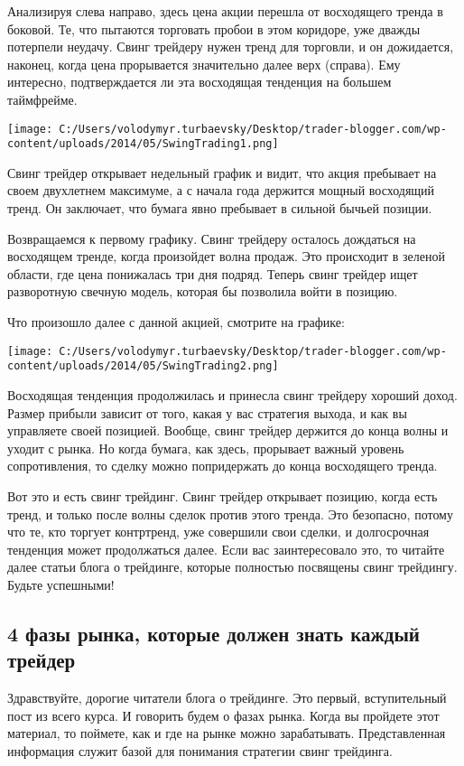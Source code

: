 \documentclass[a5paper]{article}
\begin{document}
Анализируя слева направо, здесь цена акции перешла от восходящего тренда в боковой. Те, что пытаются торговать пробои в этом коридоре, уже дважды потерпели неудачу. Свинг трейдеру нужен тренд для торговли, и он дожидается, наконец, когда цена прорывается значительно далее верх (справа). Ему интересно, подтверждается ли эта восходящая тенденция на большем таймфрейме.

\texttt{[image: C:/Users/volodymyr.turbaevsky/Desktop/trader-blogger.com/wp-content/uploads/2014/05/SwingTrading1.png]}

Свинг трейдер открывает недельный график и видит, что акция пребывает на своем двухлетнем максимуме, а с начала года держится мощный восходящий тренд. Он заключает, что бумага явно пребывает в сильной бычьей позиции.

Возвращаемся к первому графику. Свинг трейдеру осталось дождаться на восходящем тренде, когда произойдет волна продаж. Это происходит в зеленой области, где цена понижалась три дня подряд. Теперь свинг трейдер ищет разворотную свечную модель, которая бы позволила войти в позицию.

Что произошло далее с данной акцией, смотрите на графике:

\texttt{[image: C:/Users/volodymyr.turbaevsky/Desktop/trader-blogger.com/wp-content/uploads/2014/05/SwingTrading2.png]}

Восходящая тенденция продолжилась и принесла свинг трейдеру хороший доход. Размер прибыли зависит от того, какая у вас стратегия выхода, и как вы управляете своей позицией. Вообще, свинг трейдер держится до конца волны и уходит с рынка. Но когда бумага, как здесь, прорывает важный уровень сопротивления, то сделку можно попридержать до конца восходящего тренда.

Вот это и есть свинг трейдинг. Свинг трейдер открывает позицию, когда есть тренд, и только после волны сделок против этого тренда. Это безопасно, потому что те, кто торгует контртренд, уже совершили свои сделки, и долгосрочная тенденция может продолжаться далее. Если вас заинтересовало это, то читайте далее статьи блога о трейдинге, которые полностью посвящены свинг трейдингу. Будьте успешными!

\subsection{4 фазы рынка, которые должен знать каждый трейдер}

Здравствуйте, дорогие читатели блога о трейдинге. Это первый, вступительный пост из всего курса. И говорить будем о фазах рынка. Когда вы пройдете этот материал, то поймете, как и где на рынке можно зарабатывать. Представленная информация служит базой для понимания стратегии свинг трейдинга.
\end{document}
